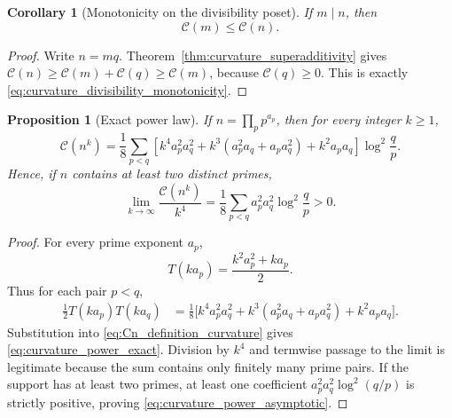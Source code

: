 \documentclass[11pt]{amsart}
\numberwithin{equation}{section}
\theoremstyle{plain}
\newtheorem{proposition}[theorem]{Proposition}
\newtheorem{corollary}[theorem]{Corollary}
\theoremstyle{definition}
\theoremstyle{remark}
\begin{document}
\begin{corollary}[Monotonicity on the divisibility poset]
\label{cor:curvature_divisibility_monotonicity}
If \(m\mid n\), then
\begin{equation}
\boxed{\mathcal C(m)\le\mathcal C(n).}
\label{eq:curvature_divisibility_monotonicity}
\end{equation}
\end{corollary}

\begin{proof}
Write \(n=mq\).  Theorem~\ref{thm:curvature_superadditivity} gives
\(\mathcal C(n)\ge\mathcal C(m)+\mathcal C(q)\ge\mathcal C(m)\), because
\(\mathcal C(q)\ge0\).  This is exactly
\eqref{eq:curvature_divisibility_monotonicity}.
\end{proof}

\begin{proposition}[Exact power law]
\label{prop:curvature_power_law}
If \(n=\prod_p p^{a_p}\), then for every integer \(k\ge1\),
\begin{equation}
\boxed{
\mathcal C(n^k)=\frac18\sum_{p<q}
\left[k^4a_p^2a_q^2+k^3(a_p^2a_q+a_pa_q^2)+k^2a_pa_q\right]
\log^2\frac qp.}
\label{eq:curvature_power_exact}
\end{equation}
Hence, if \(n\) contains at least two distinct primes,
\begin{equation}
\boxed{
\lim_{k\to\infty}\frac{\mathcal C(n^k)}{k^4}
=\frac18\sum_{p<q}a_p^2a_q^2\log^2\frac qp>0.}
\label{eq:curvature_power_asymptotic}
\end{equation}
\end{proposition}

\begin{proof}
For every prime exponent \(a_p\),
\begin{equation}
T(ka_p)=\frac{k^2a_p^2+ka_p}{2}.
\label{eq:T_ka_expansion}
\end{equation}
Thus for each pair \(p<q\),
\begin{align}
\frac12T(ka_p)T(ka_q)
&=\frac18
\bigl[k^4a_p^2a_q^2+k^3(a_p^2a_q+a_pa_q^2)+k^2a_pa_q\bigr].
\label{eq:T_pair_power_expansion}
\end{align}
Substitution into \eqref{eq:Cn_definition_curvature} gives
\eqref{eq:curvature_power_exact}.  Division by \(k^4\) and termwise passage
to the limit is legitimate because the sum contains only finitely many prime
pairs.  If the support has at least two primes, at least one coefficient
\(a_p^2a_q^2\log^2(q/p)\) is strictly positive, proving
\eqref{eq:curvature_power_asymptotic}.
\end{proof}
\end{document}
